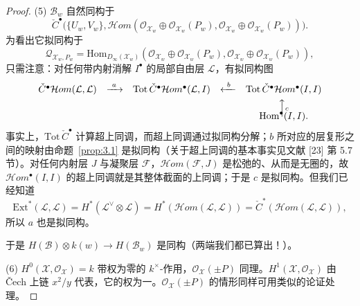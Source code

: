\begin{proof}
(5) $\mathcal{B}_w$ 自然同构于
\[
\check{C}^\bullet\bigl(\{U_w,V_w\},\mathcal{H}om(\mathcal{O}_{\mathcal{X}_w}\oplus\mathcal{O}_{\mathcal{X}_w}(P_w),\mathcal{O}_{\mathcal{X}_w}\oplus\mathcal{O}_{\mathcal{X}_w}(P_w))\bigr).
\]
为看出它拟同构于
\[
\mathcal{Q}_{\mathcal{X}_w,P_w}=\mathrm{Hom}_{D_\infty(\mathcal{X}_w)}(\mathcal{O}_{\mathcal{X}_w}\oplus\mathcal{O}_{\mathcal{X}_w}(P_w),\mathcal{O}_{\mathcal{X}_w}\oplus\mathcal{O}_{\mathcal{X}_w}(P_w)),
\]
只需注意：对任何带内射消解 $I^\bullet$ 的局部自由层 $\mathcal{L}$，有拟同构图
\[
\begin{array}{ccccc}
\check{C}^\bullet\mathcal{H}om(\mathcal{L},\mathcal{L}) & \xrightarrow{\ a\ } &
\mathrm{Tot}\,\check{C}^\bullet\mathcal{H}om^\bullet(\mathcal{L},I) & \xleftarrow{\ b\ } &
\mathrm{Tot}\,\check{C}^\bullet\mathcal{H}om^\bullet(I,I)\\[4pt]
& & & & \Big\uparrow\scriptstyle{c}\\[-6pt]
& & & & \mathrm{Hom}^\bullet(I,I).
\end{array}
\]
事实上，$\mathrm{Tot}\,\check{C}^\bullet$ 计算超上同调，而超上同调通过拟同构分解；$b$ 所对应的层复形之间的映射由命题~\ref{prop:3.1} 是拟同构（关于超上同调的基本事实见文献 [23] 第 5.7 节）。对任何内射层 $J$ 与凝聚层 $\mathcal{F}$，$\mathcal{H}om(\mathcal{F},J)$ 是松弛的、从而是无圈的，故 $\mathcal{H}om^\bullet(I,I)$ 的超上同调就是其整体截面的上同调；于是 $c$ 是拟同构。但我们已经知道
\[
\mathrm{Ext}^*(\mathcal{L},\mathcal{L})=H^*(\mathcal{L}^{\vee}\otimes\mathcal{L})
=H^*(\mathcal{H}om(\mathcal{L},\mathcal{L}))=\check{C}^*(\mathcal{H}om(\mathcal{L},\mathcal{L})),
\]
所以 $a$ 也是拟同构。


于是 $H(\mathcal{B})\otimes k(w)\to H(\mathcal{B}_w)$ 是同构（两端我们都已算出！）。

(6) $H^0(\mathcal{X},\mathcal{O}_{\mathcal{X}})=k$ 带权为零的 $k^{\times}$-作用，$\mathcal{O}_{\mathcal{X}}(\pm P)$ 同理。$H^1(\mathcal{X},\mathcal{O}_{\mathcal{X}})$ 由 Čech 上链 $x^2/y$ 代表，它的权为一。$\mathcal{O}_{\mathcal{X}}(\pm P)$ 的情形同样可用类似的论证处理。
\end{proof}

